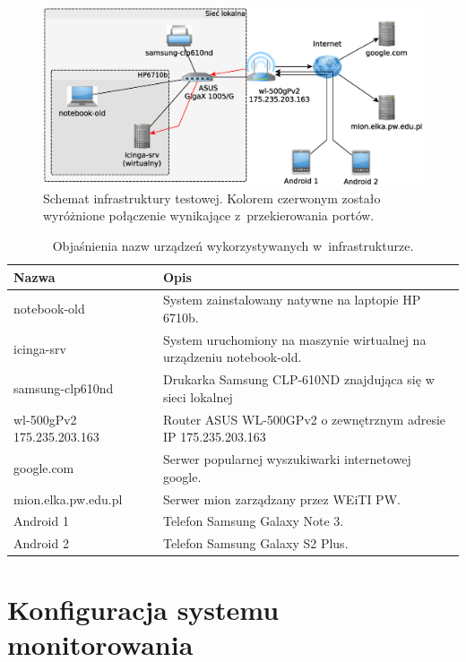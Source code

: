 \begin{figure}[ht]
  \caption{Schemat infrastruktury testowej. Kolorem czerwonym zostało
    wyróżnione połączenie wynikające z~przekierowania portów.}
  \label{fig:schematSieci}
  \centering
\includegraphics[width=1\textwidth]{img/schematSieci}
\end{figure}

\begin{table}
\centering
\caption{Objaśnienia nazw urządzeń wykorzystywanych w~infrastrukturze.}
\label{tab:devices}
\begin{tabular}{|p{4cm}||p{10cm}|}
\hline
Nazwa & Opis \\
\hline \hline
notebook-old & System zainstalowany natywne na laptopie HP 6710b. \\
\hline
icinga-srv & System uruchomiony na maszynie wirtualnej na urządzeniu notebook-old. \\
\hline
samsung-clp610nd & Drukarka Samsung CLP-610ND znajdująca się w sieci lokalnej \\
\hline
\raggedright{wl-500gPv2 175.235.203.163} & \raggedright{Router ASUS WL-500GPv2 o zewnętrznym adresie IP 175.235.203.163}
\tabularnewline
\hline
google.com & Serwer popularnej wyszukiwarki internetowej google. \\
\hline
mion.elka.pw.edu.pl & Serwer mion zarządzany przez WEiTI PW. \\
\hline
Android 1 & Telefon Samsung Galaxy Note 3. \\
\hline
Android 2 & Telefon Samsung Galaxy S2 Plus. \\
\hline
\end{tabular}
\end{table}

\section[Konfiguracja systemu monitorowania][Konfiguracja systemu
monitorowania]{Konfiguracja systemu monitorowania}

